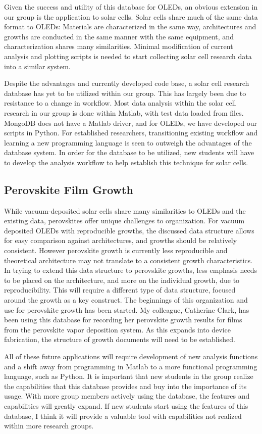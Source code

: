 \documentclass[../thesis.tex]{subfiles}
\begin{document}
Given the success and utility of this database for OLEDs, an obvious extension in our group is the application to solar cells.
Solar cells share much of the same data format to OLEDs: Materials are characterized in the same way, architectures and growths are conducted in the same manner with the same equipment, and characterization shares many similarities.
Minimal modification of current analysis and plotting scripts is needed to start collecting solar cell research data into a similar system.

Despite the advantages and currently developed code base, a solar cell research database has yet to be utilized within our group.
This has largely been due to resistance to a change in workflow.
Most data analysis within the solar cell research in our group is done within Matlab, with test data loaded from files.
MongoDB does not have a Matlab driver, and for OLEDs, we have developed our scripts in Python.
For established researchers, transitioning existing workflow and learning a new programming language is seen to outweigh the advantages of the database system.
In order for the database to be utilized, new students will have to develop the analysis workflow to help establish this technique for solar cells.

\subsection{Perovskite Film Growth}

While vacuum-deposited solar cells share many similarities to OLEDs and the existing data, perovskites offer unique challenges to organization.
For vacuum deposited OLEDs with reproducible growths, the discussed data structure allows for easy comparison against architectures, and growths should be relatively consistent.
However perovskite growth is currently less reproducible and theoretical architecture may not translate to a consistent growth characteristics.  
In trying to extend this data structure to perovskite growths, less emphasis needs to be placed on the architecture, and more on the individual growth, due to reproducibility.
This will require a different type of data structure, focused around the growth as a key construct.  
The beginnings of this organization and use for perovskite growth has been started.
My colleague, Catherine Clark, has been using this database for recording her perovskite growth results for films from the perovskite vapor deposition system.
As this expands into device fabrication, the structure of growth documents will need to be established.

All of these future applications will require development of new analysis functions and a shift away from programming in Matlab to a more functional programming language, such as Python.
It is important that new students in the group realize the capabilities that this database provides and buy into the importance of its usage.
With more group members actively using the database, the features and capabilities will greatly expand.
If new students start using the features of this database, I think it will provide a valuable tool with capabilities not realized within more research groups.



\end{document}
